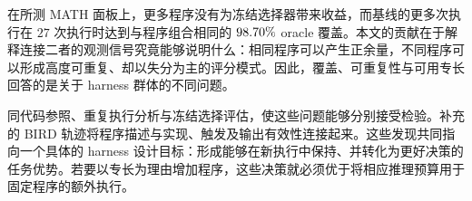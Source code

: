 在所测 MATH 面板上，更多程序没有为冻结选择器带来收益，而基线的更多次执行在 $27$ 次执行时达到与程序组合相同的 $98.70\%$ oracle 覆盖。本文的贡献在于解释连接二者的观测信号究竟能够说明什么：相同程序可以产生正余量，不同程序可以形成高度可重复、却以失分为主的评分模式。因此，覆盖、可重复性与可用专长回答的是关于 harness 群体的不同问题。

同代码参照、重复执行分析与冻结选择评估，使这些问题能够分别接受检验。补充的 BIRD 轨迹将程序描述与实现、触发及输出有效性连接起来。这些发现共同指向一个具体的 harness 设计目标：形成能够在新执行中保持、并转化为更好决策的任务优势。若要以专长为理由增加程序，这些决策就必须优于将相应推理预算用于固定程序的额外执行。
